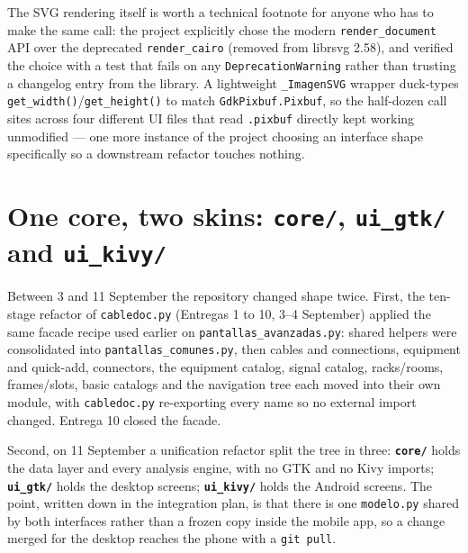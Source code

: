 \documentclass[10.4pt,twocolumn]{article}
\begin{document}
The SVG rendering itself is worth a technical footnote for anyone who has to make the same call: the project explicitly chose the modern \texttt{render\_document} API over the deprecated \texttt{render\_cairo} (removed from librsvg 2.58), and verified the choice with a test that fails on any \texttt{DeprecationWarning} rather than trusting a changelog entry from the library. A lightweight \texttt{\_ImagenSVG} wrapper duck-types \texttt{get\_width()}/\texttt{get\_height()} to match \texttt{GdkPixbuf.Pixbuf}, so the half-dozen call sites across four different UI files that read \texttt{.pixbuf} directly kept working unmodified --- one more instance of the project choosing an interface shape specifically so a downstream refactor touches nothing.

\section{One core, two skins: \texttt{core/}, \texttt{ui\_gtk/} and \texttt{ui\_kivy/}}
\label{sec:core}

Between 3 and 11 September the repository changed shape twice. First, the ten-stage refactor of \texttt{cabledoc.py} (Entregas 1 to 10, 3--4 September) applied the same facade recipe used earlier on \texttt{pantallas\_avanzadas.py}: shared helpers were consolidated into \texttt{pantallas\_comunes.py}, then cables and connections, equipment and quick-add, connectors, the equipment catalog, signal catalog, racks/rooms, frames/slots, basic catalogs and the navigation tree each moved into their own module, with \texttt{cabledoc.py} re-exporting every name so no external import changed. Entrega 10 closed the facade.

Second, on 11 September a unification refactor split the tree in three: \textbf{\texttt{core/}} holds the data layer and every analysis engine, with no GTK and no Kivy imports; \textbf{\texttt{ui\_gtk/}} holds the desktop screens; \textbf{\texttt{ui\_kivy/}} holds the Android screens. The point, written down in the integration plan, is that there is one \texttt{modelo.py} shared by both interfaces rather than a frozen copy inside the mobile app, so a change merged for the desktop reaches the phone with a \texttt{git pull}.
\end{document}
